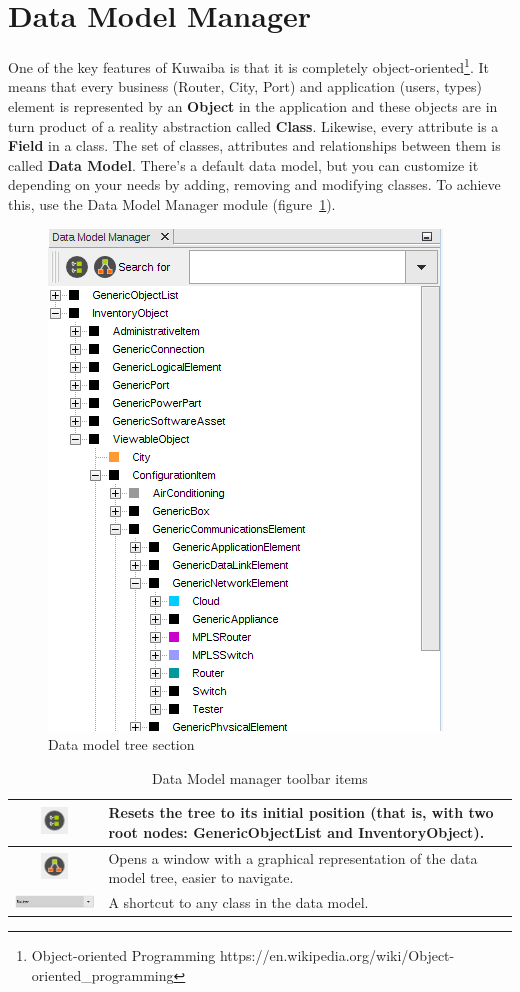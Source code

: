 \documentclass[a4paper]{article}
\begin{document}
	\section{Data Model Manager} \label{sec:data_model_manager}
		One of the key features of Kuwaiba is that it is completely object-oriented\footnote{Object-oriented Programming https://en.wikipedia.org/wiki/Object-oriented\_programming}. It means that every business (Router, City, Port) and application (users, types) element is represented by an \textbf{Object} in the application and these objects are in turn product of a reality abstraction called \textbf{Class}. Likewise, every attribute is a \textbf{Field} in a class. The set of classes, attributes and relationships between them is called \textbf{Data Model}. There's a default data model, but you can customize it depending on your needs by adding, removing and modifying classes. To achieve this, use the Data Model Manager module (figure~\ref{fig:data_model_manager}).
		\begin{figure}[h!]
			\centering
			\includegraphics[width=0.4\linewidth]{img/data_model_manager.png}
			\caption{Data model tree section}
			\label{fig:data_model_manager}
		\end{figure}
		\begin{table}[h!]
			\centering
			\begin{tabular}{cp{10cm}}
				\includegraphics[width=0.7cm]{img/icon_data_model_default_layout.png} & Resets the tree to its initial position (that is, with two root nodes: \textbf{GenericObjectList} and \textbf{InventoryObject}).\\
				\midrule
				\includegraphics[width=0.7cm]{img/icon_data_model_class_hierarchy_view.png} & Opens a window with a graphical representation of the data model tree, easier to navigate.\\
				\midrule
				\includegraphics[width=5cm]{img/data_model_manager_search.png} & A shortcut to any class in the data model.\\
			\end{tabular}
			\caption{Data Model manager toolbar items}
			\label{tab:data_model_manager_toolbar_icons}
		\end{table}
\end{document}
